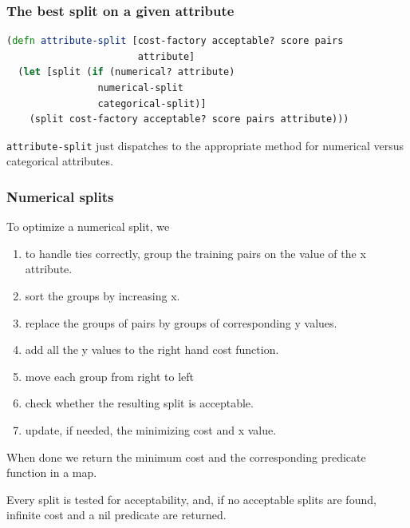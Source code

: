 \documentclass[11pt,openany,american,usenames,dvipsnames,svgnames,x11names,table,isodate]{article}
\numberwithin{equation}{section}
\numberwithin{figure}{section}
\begin{document}
\subsubsection{The best split on a given attribute}

\begin{minipage}[t]{1\columnwidth}%
\begin{lstlisting}[caption={Best split for a given attribute},label={lis:attribute-split},language=clojure,tabsize=2]
(defn attribute-split [cost-factory acceptable? score pairs 
                       attribute]
  (let [split (if (numerical? attribute) 
                numerical-split 
                categorical-split)] 
    (split cost-factory acceptable? score pairs attribute))) 
\end{lstlisting}
%
\end{minipage}

\texttt{attribute-split} just dispatches to the appropriate method
for numerical versus categorical attributes.

\subsubsection{Numerical splits}

To optimize a numerical split, we 
\begin{enumerate}
\item to handle ties correctly, group the training pairs on the value of
the x attribute.
\item sort the groups by increasing x.
\item replace the groups of pairs by groups of corresponding y values.
\item add all the y values to the right hand cost function.
\item move each group from right to left 
\item check whether the resulting split is acceptable.
\item update, if needed, the minimizing cost and x value.
\end{enumerate}
When done we return the minimum cost and the corresponding predicate
function in a map.

Every split is tested for acceptability, and, if no acceptable splits
are found, infinite cost and a nil predicate are returned.
\end{document}
